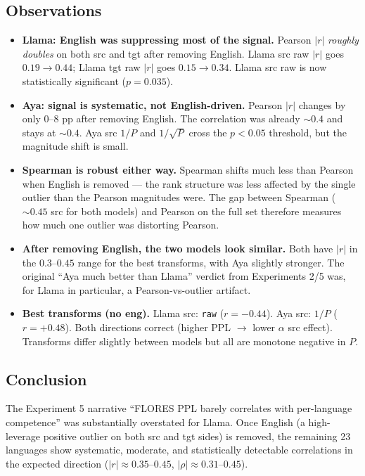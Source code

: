 \documentclass[11pt]{article}
\newcommand{\code}[1]{\texttt{\small #1}}
\begin{document}
\subsection{Observations}

\begin{itemize}
  \item \textbf{Llama: English was suppressing most of the signal.}
    Pearson $|r|$ \emph{roughly doubles} on both src and tgt after
    removing English. Llama src raw $|r|$ goes $0.19 \to 0.44$;
    Llama tgt raw $|r|$ goes $0.15 \to 0.34$. Llama src raw is now
    statistically significant ($p = 0.035$).
  \item \textbf{Aya: signal is systematic, not English-driven.} Pearson
    $|r|$ changes by only $0$--$8$ pp after removing English. The
    correlation was already $\sim 0.4$ and stays at $\sim 0.4$. Aya src
    $1/P$ and $1/\sqrt{P}$ cross the $p < 0.05$ threshold, but the
    magnitude shift is small.
  \item \textbf{Spearman is robust either way.} Spearman shifts much
    less than Pearson when English is removed --- the rank structure
    was less affected by the single outlier than the Pearson magnitudes
    were. The gap between Spearman ($\sim 0.45$ src for both models)
    and Pearson on the full set therefore measures how much one outlier
    was distorting Pearson.
  \item \textbf{After removing English, the two models look similar.}
    Both have $|r|$ in the $0.3$--$0.45$ range for the best transforms,
    with Aya slightly stronger. The original ``Aya much better than
    Llama'' verdict from Experiments 2/5 was, for Llama in particular,
    a Pearson-vs-outlier artifact.
  \item \textbf{Best transforms (no eng).} Llama src: \code{raw}
    ($r = -0.44$). Aya src: $1/P$ ($r = +0.48$). Both directions
    correct (higher PPL $\to$ lower $\alpha$ src effect). Transforms
    differ slightly between models but all are monotone negative in $P$.
\end{itemize}

\subsection{Conclusion}

The Experiment 5 narrative ``FLORES PPL barely correlates with
per-language competence'' was substantially overstated for Llama. Once
English (a high-leverage positive outlier on both src and tgt sides) is
removed, the remaining 23 languages show systematic, moderate, and
statistically detectable correlations in the expected direction
($|r| \approx 0.35$--$0.45$, $|\rho| \approx 0.31$--$0.45$).
\end{document}
